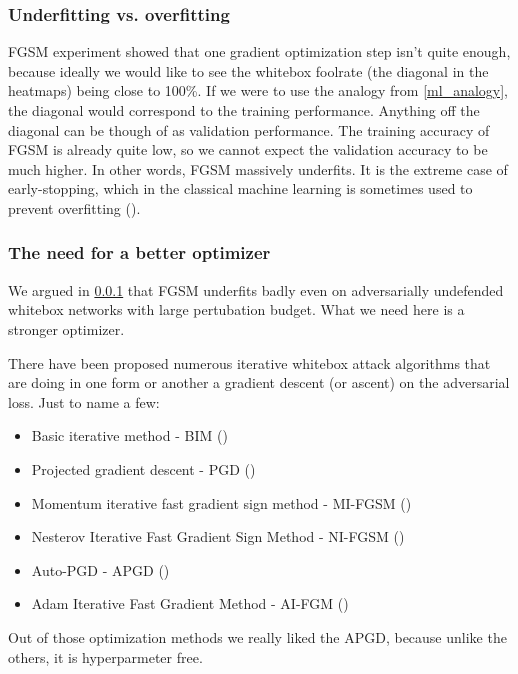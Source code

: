 \subsubsection{Underfitting vs. overfitting}
\label{fgsm_underfits}
FGSM experiment showed that one gradient optimization step isn't quite enough, because ideally we would like to see the whitebox foolrate (the diagonal in the heatmaps) being close to 100\%. If we were to use the analogy from \ref{ml_analogy}, the diagonal would correspond to the training performance. Anything off the diagonal can be though of as validation performance. The training accuracy of FGSM is already quite low, so we cannot expect the validation accuracy to be much higher. In other words, FGSM massively underfits. It is the extreme case of early-stopping, which in the classical machine learning is sometimes used to prevent overfitting (\cite{Caruana2000OverfittingIN}).

\subsubsection{The need for a better optimizer}
We argued in \ref{fgsm_underfits} that FGSM underfits badly even on adversarially undefended whitebox networks with large pertubation budget. What we need here is a stronger optimizer.

There have been proposed numerous iterative whitebox attack algorithms that are doing in one form or another a gradient descent (or ascent) on the adversarial loss. Just to name a few:

\begin{itemize}
    \item Basic iterative method - BIM (\cite{Kurakin2017AdversarialEI})
    \item Projected gradient descent - PGD (\cite{madry2019deep})
    \item Momentum iterative fast gradient sign method - MI-FGSM (\cite{Dong2018BoostingAA})
    \item Nesterov Iterative Fast Gradient Sign Method - NI-FGSM (\cite{lin2020nesterov})
    \item Auto-PGD - APGD (\cite{croce2020reliable})
    \item Adam Iterative Fast Gradient Method - AI-FGM (\cite{Yin2021BoostingAA})
\end{itemize}

Out of those optimization methods we really liked the APGD, because unlike the others, it is hyperparmeter free.

